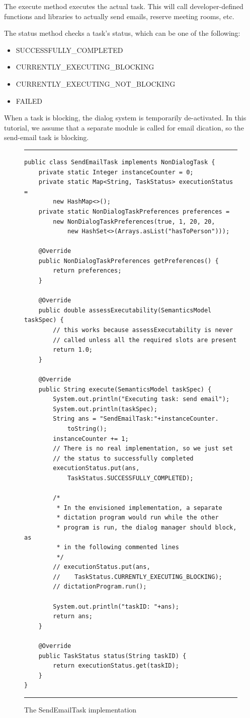 \documentclass[10pt]{article}
\begin{document}
The execute method executes the actual task.
This will call developer-defined functions and libraries to actually send emails, reserve meeting rooms, etc.

The status method checks a task's status, which can be one of the following:
\begin{itemize}
\item SUCCESSFULLY\_COMPLETED
\item CURRENTLY\_EXECUTING\_BLOCKING
\item CURRENTLY\_EXECUTING\_NOT\_BLOCKING
\item FAILED
\end{itemize}

When a task is blocking, the dialog system is temporarily de-activated.
In this tutorial, we assume that a separate module is called for email dication, so the send-email task is blocking.

\begin{figure}[ht*]
\centering
\rule{\textwidth}{1pt}
\small
\begin{verbatim}
public class SendEmailTask implements NonDialogTask {
    private static Integer instanceCounter = 0;
    private static Map<String, TaskStatus> executionStatus = 
        new HashMap<>();
    private static NonDialogTaskPreferences preferences = 
        new NonDialogTaskPreferences(true, 1, 20, 20,
            new HashSet<>(Arrays.asList("hasToPerson")));

    @Override
    public NonDialogTaskPreferences getPreferences() {
        return preferences;
    }

    @Override
    public double assessExecutability(SemanticsModel taskSpec) {
        // this works because assessExecutability is never
        // called unless all the required slots are present
        return 1.0;
    }

    @Override
    public String execute(SemanticsModel taskSpec) {
        System.out.println("Executing task: send email");
        System.out.println(taskSpec);
        String ans = "SendEmailTask:"+instanceCounter.
            toString();
        instanceCounter += 1;
        // There is no real implementation, so we just set 
        // the status to successfully completed
        executionStatus.put(ans,
            TaskStatus.SUCCESSFULLY_COMPLETED);

        /*
         * In the envisioned implementation, a separate
         * dictation program would run while the other 
         * program is run, the dialog manager should block, as
         * in the following commented lines
         */
        // executionStatus.put(ans,
        //    TaskStatus.CURRENTLY_EXECUTING_BLOCKING);
        // dictationProgram.run();

        System.out.println("taskID: "+ans);
        return ans;
    }

    @Override
    public TaskStatus status(String taskID) {
        return executionStatus.get(taskID);
    }
}
\end{verbatim}
\rule{\textwidth}{1pt}
\caption{The SendEmailTask implementation}
\label{SendEmailTask-code-figure}
\end{figure}
\end{document}
